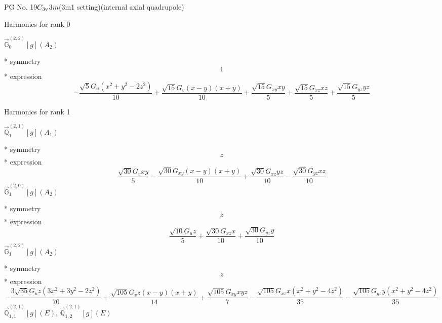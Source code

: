 \documentclass[fleqn,8pt]{jsarticle}
\begin{document}
\setcounter{MaxMatrixCols}{32}

\renewcommand{\tablename}{Table~}
\renewcommand{\figurename}{Figure~}
\begin{center}
\LARGE
PG No. 19\quad$C_{\rm 3v}$\quad$3m$\quad(3m1 setting)\quad[ trigonal ] (internal axial quadrupole)
\end{center}

\noindent * Harmonics for rank 0

\noindent\quad $\vec{\mathbb{G}}_{0}^{(2,2)}[g](A_{2})$

\noindent\quad ** symmetry
\begin{dmath*}
1
\end{dmath*}
\noindent\quad ** expression
\begin{dmath*}
- \frac{\sqrt{5} G_{u} \left(x^{2} + y^{2} - 2 z^{2}\right)}{10} + \frac{\sqrt{15} G_{v} \left(x - y\right) \left(x + y\right)}{10} + \frac{\sqrt{15} G_{xy} x y}{5} + \frac{\sqrt{15} G_{xz} x z}{5} + \frac{\sqrt{15} G_{yz} y z}{5}
\end{dmath*}

\noindent * Harmonics for rank 1

\noindent\quad $\vec{\mathbb{Q}}_{1}^{(2,1)}[g](A_{1})$

\noindent\quad ** symmetry
\begin{dmath*}
z
\end{dmath*}
\noindent\quad ** expression
\begin{dmath*}
\frac{\sqrt{30} G_{v} x y}{5} - \frac{\sqrt{30} G_{xy} \left(x - y\right) \left(x + y\right)}{10} + \frac{\sqrt{30} G_{xz} y z}{10} - \frac{\sqrt{30} G_{yz} x z}{10}
\end{dmath*}
\noindent\quad $\vec{\mathbb{G}}_{1}^{(2,0)}[g](A_{2})$

\noindent\quad ** symmetry
\begin{dmath*}
z
\end{dmath*}
\noindent\quad ** expression
\begin{dmath*}
\frac{\sqrt{10} G_{u} z}{5} + \frac{\sqrt{30} G_{xz} x}{10} + \frac{\sqrt{30} G_{yz} y}{10}
\end{dmath*}
\noindent\quad $\vec{\mathbb{G}}_{1}^{(2,2)}[g](A_{2})$

\noindent\quad ** symmetry
\begin{dmath*}
z
\end{dmath*}
\noindent\quad ** expression
\begin{dmath*}
- \frac{3 \sqrt{35} G_{u} z \left(3 x^{2} + 3 y^{2} - 2 z^{2}\right)}{70} + \frac{\sqrt{105} G_{v} z \left(x - y\right) \left(x + y\right)}{14} + \frac{\sqrt{105} G_{xy} x y z}{7} - \frac{\sqrt{105} G_{xz} x \left(x^{2} + y^{2} - 4 z^{2}\right)}{35} - \frac{\sqrt{105} G_{yz} y \left(x^{2} + y^{2} - 4 z^{2}\right)}{35}
\end{dmath*}
\noindent\quad $\vec{\mathbb{Q}}_{1,1}^{(2,1)}[g](E)$, $\vec{\mathbb{Q}}_{1,2}^{(2,1)}[g](E)$
\end{document}
